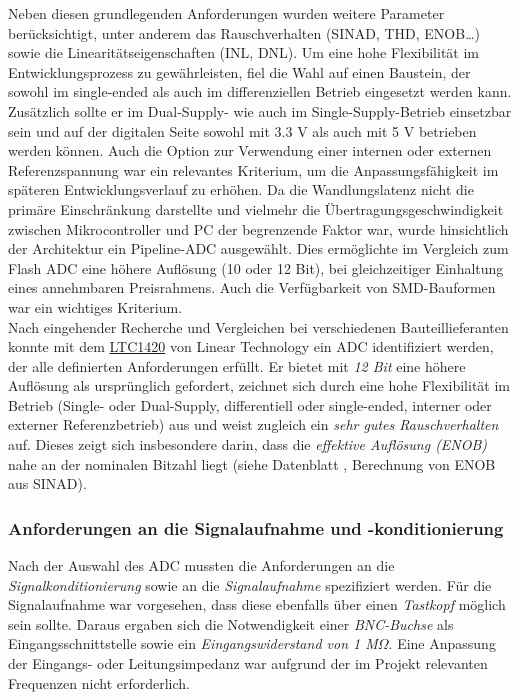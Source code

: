 \documentclass[a4paper, portrait, 12pt]{scrartcl} %
\begin{document}
Neben diesen grundlegenden Anforderungen wurden weitere Parameter berücksichtigt, unter anderem das Rauschverhalten (SINAD, THD, ENOB…) sowie die Linearitätseigenschaften (INL, DNL). Um eine hohe Flexibilität im Entwicklungsprozess zu gewährleisten, fiel die Wahl auf einen Baustein, der sowohl im single-ended als auch im differenziellen Betrieb eingesetzt werden kann. Zusätzlich sollte er im Dual-Supply- wie auch im Single-Supply-Betrieb einsetzbar sein und auf der digitalen Seite sowohl mit 3.3 V als auch mit 5 V betrieben werden können. Auch die Option zur Verwendung einer internen oder externen Referenzspannung war ein relevantes Kriterium, um die Anpassungsfähigkeit im späteren Entwicklungsverlauf zu erhöhen. Da die Wandlungslatenz nicht die primäre Einschränkung darstellte und vielmehr die Übertragungsgeschwindigkeit zwischen Mikrocontroller und PC der begrenzende Faktor war, wurde hinsichtlich der Architektur ein Pipeline-ADC ausgewählt. Dies ermöglichte im Vergleich zum Flash ADC eine höhere Auflösung (10 oder 12 Bit), bei gleichzeitiger Einhaltung eines annehmbaren Preisrahmens. Auch die Verfügbarkeit von SMD-Bauformen war ein wichtiges Kriterium.\\

Nach eingehender Recherche und Vergleichen bei verschiedenen Bauteillieferanten konnte mit dem \href{https://www.analog.com/en/products/ltc1420.html}{LTC1420} von Linear Technology ein ADC identifiziert werden, der alle definierten Anforderungen erfüllt. Er bietet mit \emph{12 Bit} eine höhere Auflösung als ursprünglich gefordert, zeichnet sich durch eine hohe Flexibilität im Betrieb (Single- oder Dual-Supply, differentiell oder single-ended, interner oder externer Referenzbetrieb) aus und weist zugleich ein \emph{sehr gutes Rauschverhalten} auf. Dieses zeigt sich insbesondere darin, dass die \emph{effektive Auflösung (ENOB)} nahe an der nominalen Bitzahl liegt (siehe Datenblatt \cite{LinearTechnology1420}, Berechnung von ENOB aus SINAD).

\subsubsection{Anforderungen an die Signalaufnahme und -konditionierung}


Nach der Auswahl des ADC mussten die Anforderungen an die \emph{Signalkonditionierung} sowie an die \emph{Signalaufnahme} spezifiziert werden. Für die Signalaufnahme war vorgesehen, dass diese ebenfalls über einen \emph{Tastkopf} möglich sein sollte. Daraus ergaben sich die Notwendigkeit einer \emph{BNC-Buchse} als Eingangsschnittstelle sowie ein \emph{Eingangswiderstand von 1 M$\Omega$}. Eine Anpassung der Eingangs- oder Leitungsimpedanz war aufgrund der im Projekt relevanten Frequenzen nicht erforderlich.\\
\end{document}
